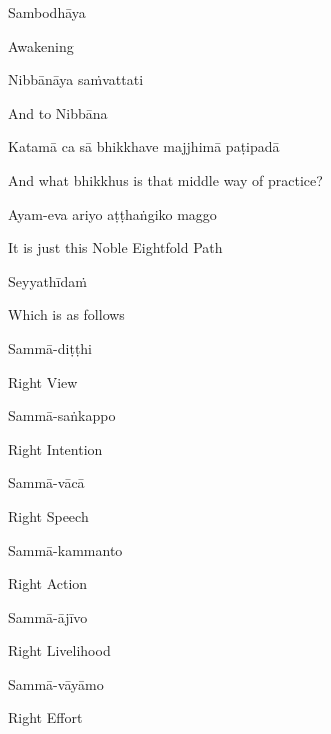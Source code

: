 Sambodhāya

\begin{english}
  Awakening
\end{english}

Nibbānāya saṁvattati

\begin{english}
  And to Nibbāna
\end{english}

Katamā ca sā bhikkhave majjhimā paṭipadā

\begin{english}
  And what bhikkhus is that middle way of practice?
\end{english}

Ayam-eva ariyo aṭṭhaṅgiko maggo

\begin{english}
  It is just this Noble Eightfold Path
\end{english}

Seyyathīdaṁ

\begin{english}
  Which is as follows
\end{english}

Sammā-diṭṭhi

\begin{english}
  Right View
\end{english}

Sammā-saṅkappo

\begin{english}
  Right Intention
\end{english}

Sammā-vācā

\begin{english}
  Right Speech
\end{english}

Sammā-kammanto

\begin{english}
  Right Action
\end{english}

Sammā-ājīvo

\begin{english}
  Right Livelihood
\end{english}

Sammā-vāyāmo

\begin{english}
  Right Effort
\end{english}

